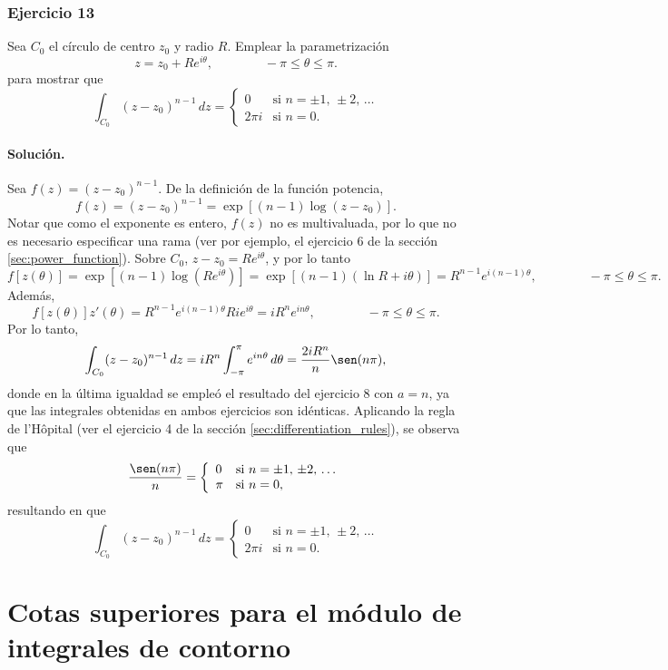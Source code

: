 \documentclass[a4paper]{report}
\begin{document}
\subsubsection{Ejercicio 13}

Sea \(C_0\) el círculo de centro \(z_0\) y radio \(R\). Emplear la parametrización 
\[
 z=z_0+Re^{i\theta},
 \qquad\qquad
 -\pi\leq\theta\leq\pi.
\]
para mostrar que 
\[
 \int_{C_0}(z-z_0)^{n-1}\,dz=
 \left\{ 
 \begin{array}{ll}
  0 &\textrm{si }n=\pm1,\,\pm2,\,\dots\\
  2\pi i&\textrm{si }n=0.
 \end{array}
 \right.
\]

\paragraph{Solución.} Sea \(f(z)=(z-z_0)^{n-1}\). De la definición de la función potencia, 
\[
 f(z)=(z-z_0)^{n-1}=\exp\left[(n-1)\log(z-z_0)\right].
\]
Notar que como el exponente es entero, \(f(z)\) no es multivaluada, por lo que no es necesario especificar una rama (ver por ejemplo, el ejercicio 6 de la sección \ref{sec:power_function}). Sobre \(C_0\), \(z-z_0=Re^{i\theta}\), y por lo tanto
\[
 f[z(\theta)]=\exp\left[(n-1)\log(Re^{i\theta})\right]=\exp\left[(n-1)(\ln R+i\theta)\right]
  =R^{n-1}e^{i(n-1)\theta},
 \qquad\qquad
 -\pi\leq\theta\leq\pi. 
\]
Además,
\[
 f[z(\theta)]z'(\theta)=R^{n-1}e^{i(n-1)\theta}Rie^{i\theta}=iR^ne^{in\theta},
 \qquad\qquad
 -\pi\leq\theta\leq\pi. 
\]
Por lo tanto,
\[
 \int_{C_0}(z-z_0)^{n-1}\,dz=iR^n\int_{-\pi}^{\pi}e^{in\theta}\,d\theta=\frac{2iR^n}{n}\sen(n\pi),
\]
donde en la última igualdad se empleó el resultado del ejercicio 8 con \(a=n\), ya que las integrales obtenidas en ambos ejercicios son idénticas. Aplicando la regla de l'Hôpital (ver el ejercicio 4 de la sección \ref{sec:differentiation_rules}), se observa que 
\[
 \frac{\sen(n\pi)}{n}=
 \left\{ 
 \begin{array}{ll}
  0 &\textrm{si }n=\pm1,\,\pm2,\,\dots\\
  \pi&\textrm{si }n=0,
 \end{array}
 \right.
\]
resultando en que 
\[
 \int_{C_0}(z-z_0)^{n-1}\,dz=
 \left\{ 
 \begin{array}{ll}
  0 &\textrm{si }n=\pm1,\,\pm2,\,\dots\\
  2\pi i&\textrm{si }n=0.
 \end{array}
 \right.
\]

\section{Cotas superiores para el módulo de integrales de contorno}\label{sec:upper_bounds_for_moduli_of_contour_integrals}
\end{document}

